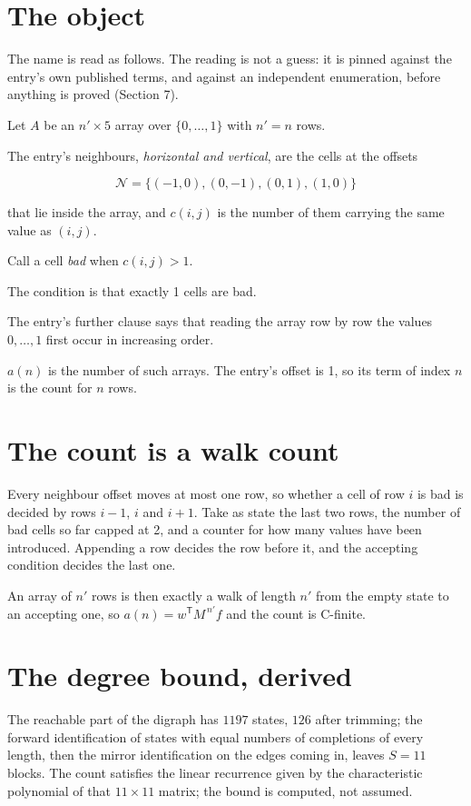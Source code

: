 \documentclass[11pt]{article}
\theoremstyle{definition}
\begin{document}
\section{The object}

The name is read as follows. The reading is not a guess: it is pinned against the entry's own published terms, and against an independent enumeration, before anything is proved (Section 7).

Let $A$ be an $n' \times 5$ array over $\{0,\dots,1\}$ with $n' = n$ rows.

The entry's neighbours, {\itshape horizontal and vertical}, are the cells at the offsets

\[\mathcal{N} = \{(-1,0), (0,-1), (0,1), (1,0)\}\]

that lie inside the array, and $c(i,j)$ is the number of them carrying the same value as $(i,j)$.

Call a cell {\itshape bad} when $c(i,j) > 1$.

The condition is that exactly 1 cells are bad.

The entry's further clause says that reading the array row by row the values $0,\dots,1$ first occur in increasing order.

$a(n)$ is the number of such arrays. The entry's offset is 1, so its term of index $n$ is the count for $n$ rows.

\section{The count is a walk count}

Every neighbour offset moves at most one row, so whether a cell of row $i$ is bad is decided by rows $i-1$, $i$ and $i+1$. Take as state the last two rows, the number of bad cells so far capped at 2, and a counter for how many values have been introduced. Appending a row decides the row before it, and the accepting condition decides the last one.

An array of $n'$ rows is then exactly a walk of length $n'$ from the empty state to an accepting one, so $a(n) = w^{\mathsf T}M^{\,n'}f$ and the count is C-finite.

\section{The degree bound, derived}

The reachable part of the digraph has $1197$ states, $126$ after trimming; the forward identification of states with equal numbers of completions of every length, then the mirror identification on the edges coming in, leaves $S = 11$ blocks. The count satisfies the linear recurrence given by the characteristic polynomial of that $11\times11$ matrix; the bound is computed, not assumed.
\end{document}
